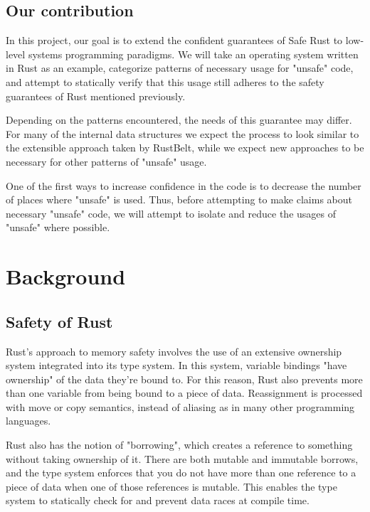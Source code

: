 \documentclass[12pt]{article}
\begin{document}
\subsection{Our contribution}
In this project, our goal is to extend the confident guarantees of Safe Rust to low-level systems programming paradigms. We will take an operating system written in Rust as an example, categorize patterns of necessary usage for "unsafe" code, and attempt to statically verify that this usage still adheres to the safety guarantees of Rust mentioned previously. 

Depending on the patterns encountered, the needs of this guarantee may differ. For many of the internal data structures we expect the process to look similar to the extensible approach taken by RustBelt, while we expect new approaches to be necessary for other patterns of "unsafe" usage.

One of the first ways to increase confidence in the code is to decrease the number of places where "unsafe" is used. Thus, before attempting to make claims about necessary "unsafe" code, we will attempt to isolate and reduce the usages of "unsafe" where possible.


\section{Background}
\subsection{Safety of Rust}
Rust's approach to memory safety involves the use of an extensive ownership system integrated into its type system. In this system, variable bindings "have ownership" of the data they're bound to. %
For this reason, Rust also prevents more than one variable from being bound to a piece of data. Reassignment is processed with move or copy semantics, instead of aliasing as in many other programming languages.

Rust also has the notion of "borrowing", which creates a reference to something without taking ownership of it. There are both mutable and immutable borrows, and the type system enforces that you do not have more than one reference to a piece of data when one of those references is mutable. This enables the type system to statically check for and prevent data races at compile time.
\end{document}
